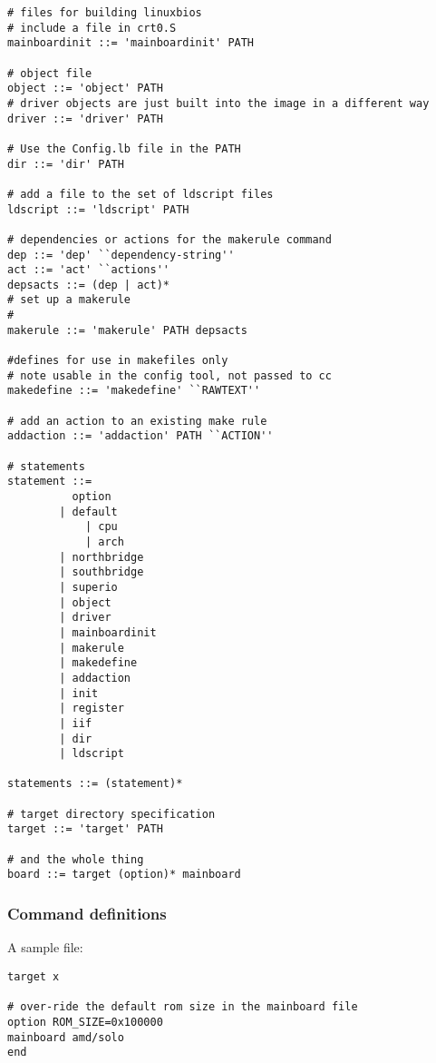 \begin{verbatim}
# files for building linuxbios
# include a file in crt0.S 
mainboardinit ::= 'mainboardinit' PATH 

# object file 
object ::= 'object' PATH
# driver objects are just built into the image in a different way
driver ::= 'driver' PATH

# Use the Config.lb file in the PATH
dir ::= 'dir' PATH

# add a file to the set of ldscript files
ldscript ::= 'ldscript' PATH

# dependencies or actions for the makerule command
dep ::= 'dep' ``dependency-string''
act ::= 'act' ``actions''
depsacts ::= (dep | act)*
# set up a makerule
#
makerule ::= 'makerule' PATH depsacts

#defines for use in makefiles only
# note usable in the config tool, not passed to cc
makedefine ::= 'makedefine' ``RAWTEXT''

# add an action to an existing make rule
addaction ::= 'addaction' PATH ``ACTION''

# statements
statement ::= 
		  option
		| default
        	| cpu
        	| arch
		| northbridge
		| southbridge
		| superio
		| object
		| driver
		| mainboardinit
		| makerule
		| makedefine
		| addaction
		| init
		| register
		| iif
		| dir
		| ldscript

statements ::= (statement)*

# target directory specification
target ::= 'target' PATH

# and the whole thing
board ::= target (option)* mainboard

\end{verbatim}

\subsubsection{Command definitions}


A sample file:

\begin{verbatim}
target x

# over-ride the default rom size in the mainboard file
option ROM_SIZE=0x100000
mainboard amd/solo
end

\end{verbatim}

